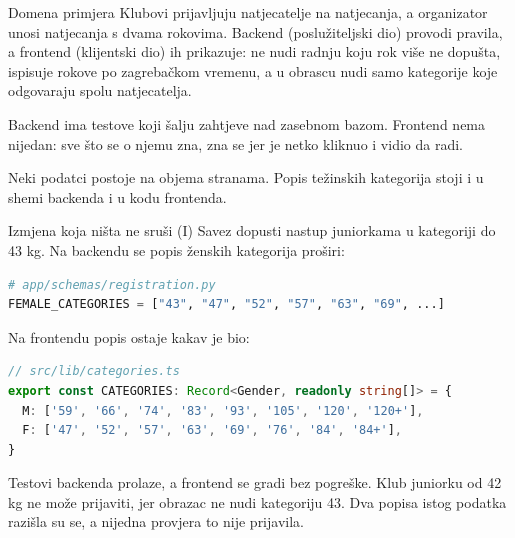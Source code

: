 \begin{frame}{Domena primjera}
Klubovi prijavljuju natjecatelje na natjecanja, a organizator unosi natjecanja s dvama rokovima. Backend (poslužiteljski dio) provodi pravila, a frontend (klijentski dio) ih prikazuje: ne nudi radnju koju rok više ne dopušta, ispisuje rokove po zagrebačkom vremenu, a u obrascu nudi samo kategorije koje odgovaraju spolu natjecatelja.

\vspace{0.9em}
Backend ima testove koji šalju zahtjeve nad zasebnom bazom. Frontend nema nijedan: sve što se o njemu zna, zna se jer je netko kliknuo i vidio da radi.

\vspace{0.9em}
Neki podatci postoje na objema stranama. Popis težinskih kategorija stoji i u shemi backenda i u kodu frontenda.
\end{frame}

\begin{frame}[fragile]{Izmjena koja ništa ne sruši (I)}
Savez dopusti nastup juniorkama u kategoriji do 43 kg. Na backendu se popis ženskih kategorija proširi:

\begin{lstlisting}[language=python]
# app/schemas/registration.py
FEMALE_CATEGORIES = ["43", "47", "52", "57", "63", "69", ...]
\end{lstlisting}

\vspace{0.1em}
Na frontendu popis ostaje kakav je bio:

\begin{lstlisting}[language=typescript]
// src/lib/categories.ts
export const CATEGORIES: Record<Gender, readonly string[]> = {
  M: ['59', '66', '74', '83', '93', '105', '120', '120+'],
  F: ['47', '52', '57', '63', '69', '76', '84', '84+'],
}
\end{lstlisting}

\vspace{0.1em}
Testovi backenda prolaze, a frontend se gradi bez pogreške. Klub juniorku od 42 kg ne može prijaviti, jer obrazac ne nudi kategoriju 43. Dva popisa istog podatka razišla su se, a nijedna provjera to nije prijavila.
\end{frame}

